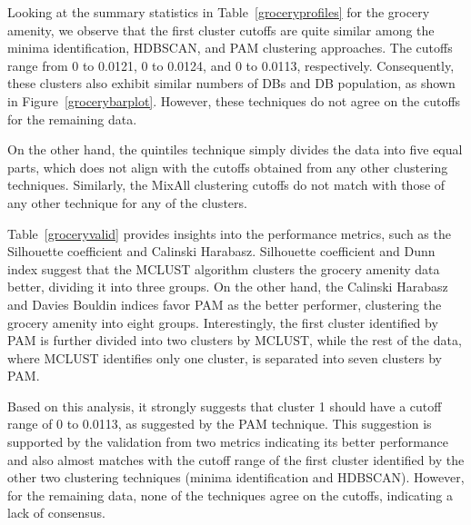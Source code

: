 \documentclass[11pt, a4paper]{article}
\begin{document}
Looking at the summary statistics in Table~\ref{groceryprofiles} for the grocery amenity, we observe that the first cluster cutoffs are quite similar among the minima identification, HDBSCAN, and PAM clustering approaches. The cutoffs range from 0 to 0.0121, 0 to 0.0124, and 0 to 0.0113, respectively. Consequently,  these clusters also exhibit similar numbers of DBs and DB population, as shown in Figure~\ref{grocerybarplot}. However, these techniques do not agree on the cutoffs for the remaining data.
\par
On the other hand, the quintiles technique simply divides the data into five equal parts, which does not align with the cutoffs obtained from any other clustering techniques. Similarly, the MixAll clustering cutoffs do not match with those of any other technique for any of the clusters.
\par
Table~\ref{groceryvalid} provides insights into the performance metrics, such as the Silhouette coefficient and Calinski Harabasz. Silhouette coefficient and Dunn index suggest that the MCLUST algorithm clusters the grocery amenity data better, dividing it into three groups. On the other hand, the Calinski Harabasz and Davies Bouldin indices favor PAM as the better performer, clustering the grocery amenity into eight groups. Interestingly, the first cluster identified by PAM is further divided into two clusters by MCLUST, while the rest of the data, where MCLUST identifies only one cluster, is separated into seven clusters by PAM.
\par
Based on this analysis, it strongly suggests that cluster 1 should have a cutoff range of 0 to 0.0113, as suggested by the PAM technique. This suggestion is supported by the validation from two metrics indicating its better performance and also almost matches with the cutoff range of the first cluster identified by the other two clustering techniques (minima identification and HDBSCAN). However, for the remaining data, none of the techniques agree on the cutoffs, indicating a lack of consensus.
\end{document}
